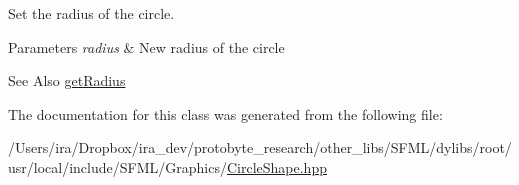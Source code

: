 Set the radius of the circle. 


\begin{DoxyParams}{Parameters}
{\em radius} & New radius of the circle\\
\hline
\end{DoxyParams}
\begin{DoxySeeAlso}{See Also}
\hyperlink{classsf_1_1_circle_shape_afaf5175a75b6179cc177b1281027ab00}{get\-Radius} 
\end{DoxySeeAlso}


The documentation for this class was generated from the following file\-:\begin{DoxyCompactItemize}
\item 
/\-Users/ira/\-Dropbox/ira\-\_\-dev/protobyte\-\_\-research/other\-\_\-libs/\-S\-F\-M\-L/dylibs/root/usr/local/include/\-S\-F\-M\-L/\-Graphics/\hyperlink{_circle_shape_8hpp}{Circle\-Shape.\-hpp}\end{DoxyCompactItemize}
